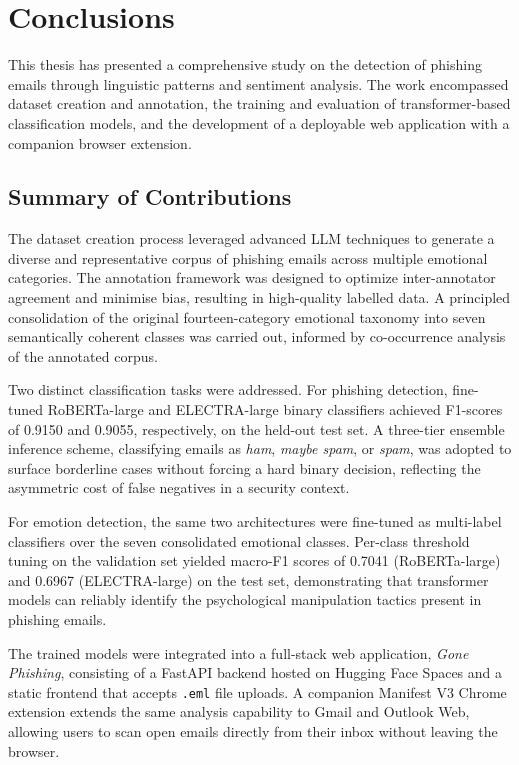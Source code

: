 \chapter{Conclusions}
\label{chapter:conclusion}

This thesis has presented a comprehensive study on the detection of phishing emails through linguistic patterns and sentiment analysis. The work encompassed dataset creation and annotation, the training and evaluation of transformer-based classification models, and the development of a deployable web application with a companion browser extension.

\section{Summary of Contributions}

The dataset creation process leveraged advanced \acs{LLM} techniques to generate a diverse and representative corpus of phishing emails across multiple emotional categories. The annotation framework was designed to optimize inter-annotator agreement and minimise bias, resulting in high-quality labelled data. A principled consolidation of the original fourteen-category emotional taxonomy into seven semantically coherent classes was carried out, informed by co-occurrence analysis of the annotated corpus.

Two distinct classification tasks were addressed. For phishing detection, fine-tuned \acs{RoBERTa}-large and \acs{ELECTRA}-large binary classifiers achieved F1-scores of 0.9150 and 0.9055, respectively, on the held-out test set. A three-tier ensemble inference scheme,  classifying emails as \textit{ham}, \textit{maybe spam}, or \textit{spam}, was adopted to surface borderline cases without forcing a hard binary decision, reflecting the asymmetric cost of false negatives in a security context.

For emotion detection, the same two architectures were fine-tuned as multi-label classifiers over the seven consolidated emotional classes. Per-class threshold tuning on the validation set yielded macro-F1 scores of 0.7041 (\acs{RoBERTa}-large) and 0.6967 (\acs{ELECTRA}-large) on the test set, demonstrating that transformer models can reliably identify the psychological manipulation tactics present in phishing emails.

The trained models were integrated into a full-stack web application, \textit{Gone Phishing}, consisting of a FastAPI backend hosted on Hugging Face Spaces and a static frontend that accepts \texttt{.eml} file uploads. A companion Manifest V3 Chrome extension extends the same analysis capability to Gmail and Outlook Web, allowing users to scan open emails directly from their inbox without leaving the browser.

